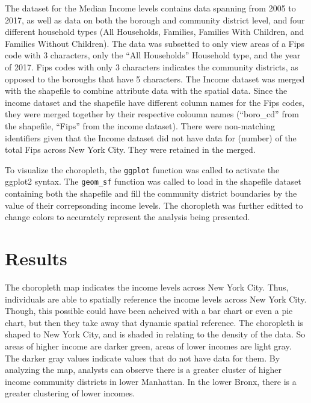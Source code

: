 \documentclass[man]{apa6}
\begin{document}
The dataset for the Median Income levels contains data spanning from 2005 to 2017, as well as data on both the borough and community district level, and four different household types (All Households, Families, Families With Children, and Families Without Children). The data was subsetted to only view areas of a Fips code with 3 characters, only the \enquote{All Households} Household type, and the year of 2017. Fips codes with only 3 characters indicates the community districts, as opposed to the boroughs that have 5 characters. The Income dataset was merged with the shapefile to combine attribute data with the spatial data. Since the income dataset and the shapefile have different column names for the Fips codes, they were merged together by their respective coloumn names (\enquote{boro\_cd} from the shapefile, \enquote{Fips} from the income dataset). There were non-matching identifiers given that the Income dataset did not have data for (number) of the total Fips across New York City. They were retained in the merged.

To visualize the choropleth, the \texttt{ggplot} function was called to activate the ggplot2 syntax. The \texttt{geom\_sf} function was called to load in the shapefile dataset containing both the shapefile and fill the community district boundaries by the value of their correpsonding income levels. The choropleth was further editted to change colors to accurately represent the analysis being presented.

\hypertarget{results}{%
\section{Results}\label{results}}

The choropleth map indicates the income levels across New York City. Thus, individuals are able to spatially reference the income levels across New York City. Though, this possible could have been acheived with a bar chart or even a pie chart, but then they take away that dynamic spatial reference. The choropleth is shaped to New York City, and is shaded in relating to the density of the data. So areas of higher income are darker green, areas of lower incomes are light gray. The darker gray values indicate values that do not have data for them. By analyzing the map, analysts can observe there is a greater cluster of higher income community districts in lower Manhattan. In the lower Bronx, there is a greater clustering of lower incomes.
\end{document}
